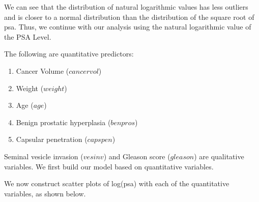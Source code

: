 \documentclass[12pt,letterpaper,titlepage,en-US]{article}
\begin{document}
We can see that the distribution of natural logarithmic values has less outliers and is closer to a normal distribution than the distribution of the square root of psa. Thus, we continue with our analysis using the natural logarithmic value of the PSA Level.

The following are quantitative predictors:
\begin{enumerate}[leftmargin=*]
    \item Cancer Volume ($cancervol$)
    \item Weight ($weight$)
    \item Age ($age$)
    \item Benign prostatic hyperplasia ($benpros$)
    \item Capsular penetration ($capspen$)
\end{enumerate}


Seminal vesicle invasion ($vesinv$) and Gleason score ($gleason$) are qualitative variables. We first build our model based on quantitative variables.

We now construct scatter plots of log(psa) with each of the quantitative variables, as shown below.
\end{document}
